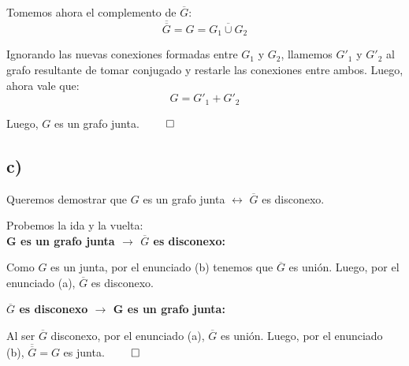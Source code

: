 \documentclass{article}
\begin{document}
Tomemos ahora el complemento de $\overline{G}$:
\[\overline{\overline{G}} = G = \overline{G_1 \cup G_2}\]

Ignorando las nuevas conexiones formadas entre $G_1$ y $G_2$, llamemos $G'_1$ y $G'_2$ al grafo resultante de tomar conjugado y restarle las conexiones entre ambos. Luego, ahora vale que:
\[G = G'_1 + G'_2\]

Luego, $G$ es un grafo junta. $\qed$

\subsection*{c)}
Queremos demostrar que $G$ es un grafo junta $\leftrightarrow$ $\overline{G}$ es disconexo.

Probemos la ida y la vuelta:\\

\textbf{G es un grafo junta $\rightarrow$ $\overline{G}$ es disconexo:}

Como $G$ es un junta, por el enunciado (b) tenemos que $\overline{G}$ es unión. Luego, por el enunciado (a), $\overline{G}$ es disconexo.

\textbf{$\overline{G}$ es disconexo $\rightarrow$ G es un grafo junta:}

Al ser $\overline{G}$ disconexo, por el enunciado (a), $\overline{G}$ es unión. Luego, por el enunciado (b), $\overline{\overline{G}} = G$ es junta. 
$\qed$
\end{document}
